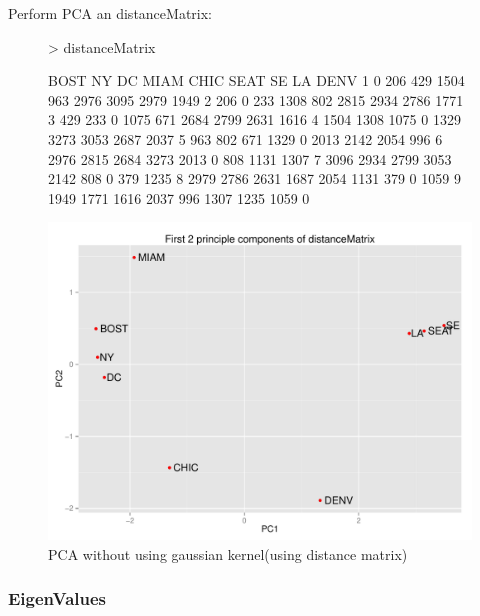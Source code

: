\documentclass{article}
\begin{document}
Perform PCA an distanceMatrix: 
\begin{figure}
\begin{Schunk}
\begin{Sinput}
> distanceMatrix
\end{Sinput}
\begin{Soutput}
  BOST   NY   DC MIAM CHIC SEAT   SE   LA DENV
1    0  206  429 1504  963 2976 3095 2979 1949
2  206    0  233 1308  802 2815 2934 2786 1771
3  429  233    0 1075  671 2684 2799 2631 1616
4 1504 1308 1075    0 1329 3273 3053 2687 2037
5  963  802  671 1329    0 2013 2142 2054  996
6 2976 2815 2684 3273 2013    0  808 1131 1307
7 3096 2934 2799 3053 2142  808    0  379 1235
8 2979 2786 2631 1687 2054 1131  379    0 1059
9 1949 1771 1616 2037  996 1307 1235 1059    0
\end{Soutput}
\end{Schunk}
\includegraphics{hw3_saket-010}
\caption{PCA without using gaussian kernel(using distance matrix)}
\end{figure}

\subsubsection{EigenValues}
\end{document}
